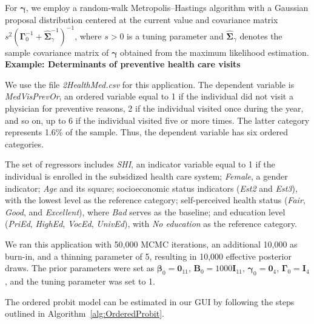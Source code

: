 For $\bm{\gamma}$, we employ a random-walk Metropolis--Hastings algorithm with a Gaussian proposal distribution centered at the current value and covariance matrix $s^2(\bm{\Gamma}_0^{-1} + \hat{\bm{\Sigma}}_{\gamma}^{-1})^{-1}$, where $s > 0$ is a tuning parameter and $\hat{\bm{\Sigma}}_{\gamma}$ denotes the sample covariance matrix of $\bm{\gamma}$ obtained from the maximum likelihood estimation.\\

\textbf{Example: Determinants of preventive health care visits}

We use the file \textit{2HealthMed.csv} for this application. The dependent variable is \textit{MedVisPrevOr}, an ordered variable equal to 1 if the individual did not visit a physician for preventive reasons, 2 if the individual visited once during the year, and so on, up to 6 if the individual visited five or more times. The latter category represents 1.6\% of the sample. Thus, the dependent variable has six ordered categories.

The set of regressors includes \textit{SHI}, an indicator variable equal to 1 if the individual is enrolled in the subsidized health care system; \textit{Female}, a gender indicator; \textit{Age} and its square; socioeconomic status indicators (\textit{Est2} and \textit{Est3}), with the lowest level as the reference category; self-perceived health status (\textit{Fair}, \textit{Good}, and \textit{Excellent}), where \textit{Bad} serves as the baseline; and education level (\textit{PriEd}, \textit{HighEd}, \textit{VocEd}, \textit{UnivEd}), with \textit{No education} as the reference category.

We ran this application with 50,000 MCMC iterations, an additional 10,000 as burn-in, and a thinning parameter of 5, resulting in 10,000 effective posterior draws. The prior parameters were set as $\bm{\beta}_0 = \bm{0}_{11}$, $\bm{B}_0 = 1000\bm{I}_{11}$, $\bm{\gamma}_0 = \bm{0}_4$, $\bm{\Gamma}_0 = \bm{I}_4$, and the tuning parameter was set to 1.

The ordered probit model can be estimated in our GUI by following the steps outlined in Algorithm~\ref{alg:OrderedProbit}.
 
